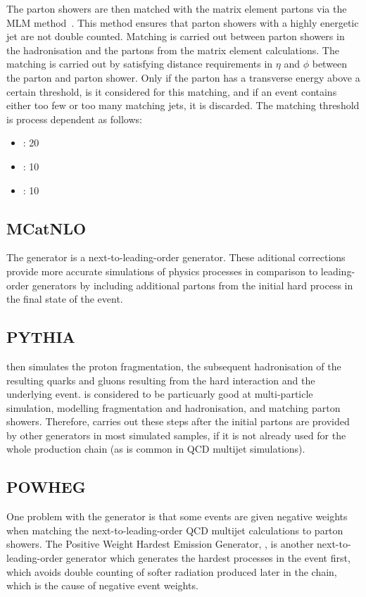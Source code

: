 The parton showers are then matched with the matrix element partons via the MLM method~\cite{mlm}. This
method ensures that parton showers with a highly energetic jet are not double counted. Matching is carried out
between parton showers in the hadronisation and the partons from the matrix element calculations. The matching
is carried out by satisfying distance requirements in $\eta$ and $\phi$ between the parton and parton shower.
Only if the parton has a transverse energy above a certain threshold, is it considered for this matching, and
if an event contains either too few or too many matching jets, it is discarded. The matching threshold is
process dependent as follows:

\onehalfspacing
\begin{itemize}
  \item \ttbar: 20\GeV
  \item \WpJets: 10\GeV
  \item \ZpJets: 10\GeV
\end{itemize}
\doublespacing

\subsection{MCatNLO}
\label{ss:mcatnlo}
The \MCATNLO \cite{mcatnlo_Frixione1, mcatnlo_Frixione2} generator is a next-to-leading-order generator. These
aditional corrections provide more accurate simulations of physics processes in comparison to leading-order
generators by including additional partons from the initial hard process in the final state of the event.

\subsection{PYTHIA}
\label{ss:pythia}
\PYTHIA \cite{pythia8} then simulates the proton fragmentation, the subsequent hadronisation of the
resulting quarks and gluons resulting from the hard interaction and the underlying event. \PYTHIA is
considered to be particuarly good at multi-particle simulation, modelling fragmentation and hadronisation, and
matching parton showers. Therefore, \PYTHIA carries out these steps after the initial partons are provided
by other generators in most simulated samples, if it is not already used for the whole production chain (as is
common in QCD multijet simulations).

\subsection{POWHEG}
\label{ss:powheg}
One problem with the \MCATNLO generator is that some events are given negative weights when matching
the next-to-leading-order QCD multijet calculations to parton showers.  The Positive Weight Hardest Emission
Generator, \POWHEG \cite{powheg_Frixione, powheg_Nason, powheg_Alioli}, is another next-to-leading-order
generator which generates the hardest processes in the event first, which avoids double counting of
softer radiation produced later in the chain, which is the cause of negative event weights.

